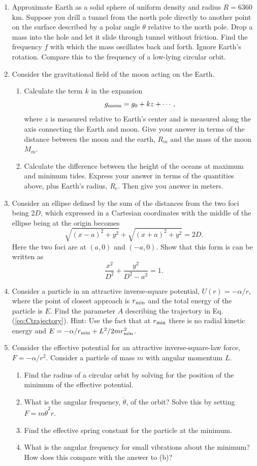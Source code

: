 \begin{enumerate}

\item Approximate Earth as a solid sphere of uniform density and radius $R=6360$ km. Suppose you drill a tunnel from the north pole directly to another point on the surface described by a polar angle $\theta$ relative to the north pole. Drop a mass into the hole and let it slide through tunnel without friction. Find the frequency $f$ with which the mass oscillates back and forth. Ignore Earth's rotation. Compare this to the frequency of a low-lying circular orbit.

\item Consider the gravitational field of the moon acting on the Earth.
\begin{enumerate}
\item Calculate the term $k$ in the expansion
\[
g_{\rm moon}=g_0+kz+\cdots,
\]
where $z$ is measured relative to Earth's center and is measured along the axis connecting the Earth and moon. Give your answer in terms of the distance between the moon and the earth, $R_{m}$ and the mass of the moon $M_m$. 
\item Calculate the difference between the height of the oceans at maximum and minimum tides. Express your answer in terms of the quantities above, plus Earth's radius, $R_e$. Then give you answer in meters.
\end{enumerate}

\item Consider an ellipse defined by the sum of the distances from the two foci being $2D$, which expressed in a Cartesian coordinates with the middle of the ellipse being at the origin becomes
\[
\sqrt{(x-a)^2+y^2}+\sqrt{(x+a)^2+y^2}=2D.
\]
Here the two foci are at $(a,0)$ and $(-a,0)$. Show that this form is can be written as
\[
\frac{x^2}{D^2}+\frac{y^2}{D^2-a^2}=1.
\]

\item Consider a particle in an attractive inverse-square potential, $U(r)=-\alpha/r$, where the point of closest approach is $r_{\rm min}$ and the total energy of the particle is $E$. Find the parameter $A$ describing the trajectory in Eq. (\ref{eq:Ctrajectory}). Hint: Use the fact that at $r_{\rm min}$ there is no radial kinetic energy and $E=-\alpha/r_{\rm min}+L^2/2mr_{\rm min}^2$.

\item Consider the effective potential for an attractive inverse-square-law force, $F=-\alpha/r^2$. Consider a particle of mass $m$ with angular momentum $L$.
\begin{enumerate}
\item Find the radius of a circular orbit by solving for the position of the minimum of the effective potential. 
\item What is the angular frequency, $\dot{\theta}$, of the orbit? Solve this by setting $F=m\dot{\theta}^2r$.
\item Find the effective spring constant for the particle at the minimum.
\item What is the angular frequency for small vibrations about the minimum? How does this compare with the answer to (b)?
\end{enumerate}


\end{enumerate}
